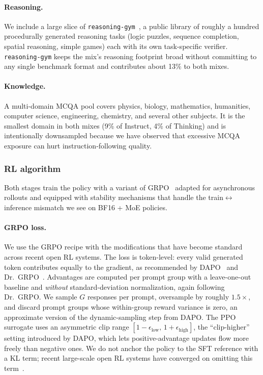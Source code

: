 \documentclass[11pt,a4paper]{article}
\begin{document}
\paragraph{Reasoning.}
We include a large slice of \texttt{reasoning-gym}~\cite{stojanovski2025reasoninggym}, a public library of
roughly a hundred procedurally generated reasoning tasks (logic
puzzles, sequence completion, spatial reasoning, simple games) each
with its own task-specific verifier. \texttt{reasoning-gym} keeps the
mix's reasoning footprint broad without committing to any single
benchmark format and contributes about 13\% to both mixes.

\paragraph{Knowledge.}
A multi-domain MCQA pool covers physics, biology, mathematics,
humanities, computer science, engineering, chemistry, and several other
subjects. It is the smallest domain in both mixes (9\% of Instruct,
4\% of Thinking) and is intentionally downsampled because we have
observed that excessive MCQA exposure can hurt instruction-following
quality.

\subsubsection{RL algorithm}
\label{sec:rl-algorithm}

Both stages train the policy with a variant of
GRPO~\cite{shao2024deepseekmath} adapted for asynchronous rollouts and
equipped with stability mechanisms that handle the
train$\leftrightarrow$inference mismatch we see on BF16 + MoE policies.

\paragraph{GRPO loss.}
We use the GRPO recipe with the modifications that have become standard
across recent open RL systems. The loss is token-level: every valid
generated token contributes equally to the gradient, as recommended by
DAPO~\cite{yu2025dapo} and Dr.~GRPO~\cite{liu2025understanding}.
Advantages are computed per prompt group with a leave-one-out baseline
and \emph{without} standard-deviation normalization, again following
Dr.~GRPO. We sample $G$ responses per prompt, oversample by roughly
$1.5\times$, and discard prompt groups whose within-group reward
variance is zero, an approximate version of the dynamic-sampling step
from DAPO. The PPO surrogate uses an asymmetric clip range
$[1 - \epsilon_\text{low},\, 1 + \epsilon_\text{high}]$, the
``clip-higher'' setting introduced by DAPO, which lets positive-advantage
updates flow more freely than negative ones. We do not anchor the policy
to the SFT reference with a KL term; recent large-scale open RL systems
have converged on omitting this
term~\cite{olmo3,yang2025qwen3,nemotronnanov2,yu2025dapo}.
\end{document}
